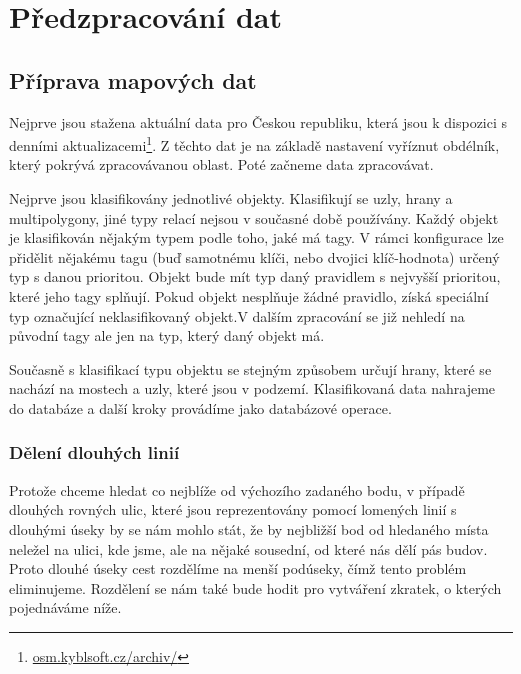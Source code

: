 \chapter{Předzpracování dat}


\section{Příprava mapových dat}
Nejprve jsou stažena aktuální data pro Českou republiku, která jsou k dispozici
s denními aktualizacemi\footnote{\url{osm.kyblsoft.cz/archiv/}}. Z těchto dat je
na základě nastavení vyříznut obdélník, který pokrývá zpracovávanou oblast. Poté
začneme data zpracovávat.

Nejprve jsou klasifikovány jednotlivé objekty. Klasifikují se uzly, hrany a
multipolygony, jiné typy relací nejsou v současné době používány. Každý objekt
je klasifikován nějakým typem podle toho, jaké má tagy. V rámci konfigurace lze
přidělit nějakému tagu (buď samotnému klíči, nebo dvojici klíč-hodnota) určený
typ s danou prioritou. Objekt bude mít typ daný pravidlem s nejvyšší prioritou,
které jeho tagy splňují. Pokud objekt nesplňuje žádné pravidlo, získá speciální
typ označující neklasifikovaný objekt.V dalším zpracování se již nehledí na
původní tagy ale jen na typ, který daný objekt má.

Současně s klasifikací typu objektu se stejným způsobem určují hrany, které se
nachází na mostech a uzly, které jsou v podzemí. Klasifikovaná data nahrajeme do
databáze a další kroky provádíme jako databázové operace. 

\subsection{Dělení dlouhých linií}
Protože chceme hledat co nejblíže od výchozího zadaného bodu, v případě dlouhých
rovných ulic, které jsou reprezentovány pomocí lomených linií s dlouhými úseky
by se nám mohlo stát, že by nejbližší bod od hledaného místa neležel na ulici,
kde jsme, ale na nějaké sousední, od které nás dělí pás budov. Proto dlouhé
úseky cest rozdělíme na menší podúseky, čímž tento problém eliminujeme.
Rozdělení se nám také bude hodit pro vytváření zkratek, o kterých pojednáváme
níže.

